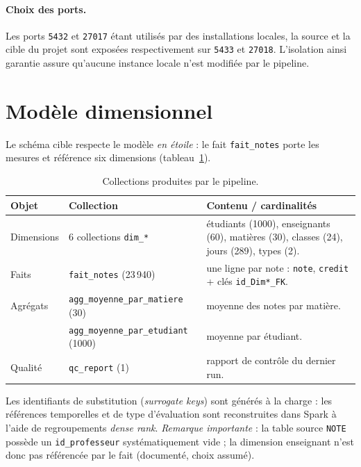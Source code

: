 ﻿\documentclass[10pt,a4paper]{article}
\begin{document}
\paragraph{Choix des ports.} Les ports \texttt{5432} et \texttt{27017} étant utilisés par des
installations locales, la source et la cible du projet sont exposées respectivement sur
\texttt{5433} et \texttt{27018}. L'isolation ainsi garantie assure qu'aucune instance locale
n'est modifiée par le pipeline.

\section{Modèle dimensionnel}\label{sec:modele}
Le schéma cible respecte le modèle \emph{en étoile} : le fait \texttt{fait\_notes} porte les mesures
et référence six dimensions (tableau~\ref{tab:etoile}).

\begin{table}[h]
  \centering
  \small
  \begin{tabular}{@{}llp{6.2cm}@{}}
    \toprule
    \textbf{Objet} & \textbf{Collection} & \textbf{Contenu / cardinalités} \\
    \midrule
    Dimensions & 6 collections \texttt{dim\_*} & étudiants (1000), enseignants (60),
    matières (30), classes (24), jours (289), types (2). \\
    \midrule
    Faits & \texttt{fait\_notes} (23\,940) & une ligne par note : \texttt{note},
    \texttt{credit} + clés \texttt{id\_Dim*\_FK}. \\
    \midrule
    Agrégats & \texttt{agg\_moyenne\_par\_matiere} (30) & moyenne des notes par matière. \\
             & \texttt{agg\_moyenne\_par\_etudiant} (1000) & moyenne par étudiant. \\
    \midrule
    Qualité & \texttt{qc\_report} (1) & rapport de contrôle du dernier run. \\
    \bottomrule
  \end{tabular}
  \caption{Collections produites par le pipeline.}
  \label{tab:etoile}
\end{table}

Les identifiants de substitution (\emph{surrogate keys}) sont générés à la charge : les références
temporelles et de type d'évaluation sont reconstruites dans Spark à l'aide de regroupements
\emph{dense rank}. \emph{Remarque importante} : la table source \texttt{NOTE} possède un
\texttt{id\_professeur} systématiquement vide ; la dimension enseignant n'est donc pas référencée
par le fait (documenté, choix assumé).
\end{document}
